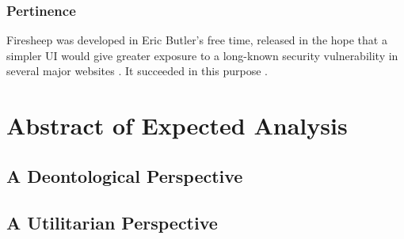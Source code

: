 \documentclass[12pt]{article}
\begin{document}
\subsubsection{Pertinence}
Firesheep was developed in Eric Butler's free time, released in the hope that a simpler UI would give greater exposure to a long-known security vulnerability in several major websites \cite{firesheep-huge-hit}. It succeeded in this purpose \cite{firesheep-day-later}.



\section{Abstract of Expected Analysis}

\subsection{A Deontological Perspective}


\subsection{A Utilitarian Perspective}




\nocite{*}




\end{document}
